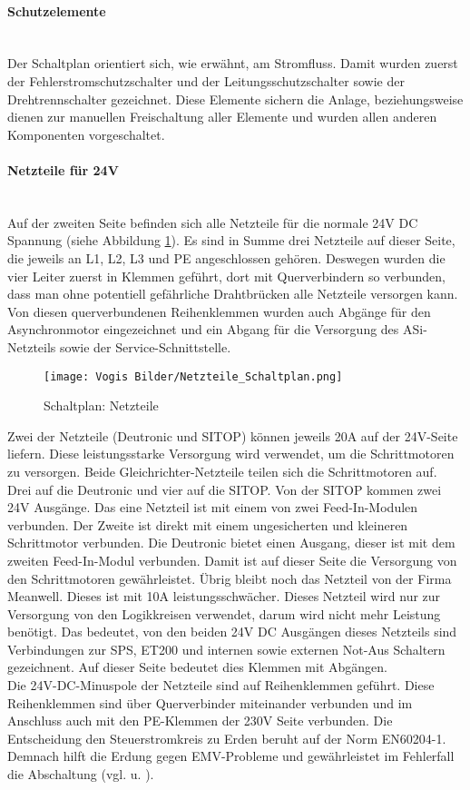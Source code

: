     \paragraph{Schutzelemente }\mbox{}\\
    Der Schaltplan orientiert sich, wie erwähnt, am Stromfluss. Damit wurden zuerst der Fehlerstromschutzschalter und der Leitungsschutzschalter sowie der Drehtrennschalter gezeichnet. Diese Elemente sichern die Anlage, beziehungsweise dienen zur manuellen Freischaltung aller Elemente und wurden allen anderen Komponenten vorgeschaltet.
    \paragraph{Netzteile für 24V }\mbox{}\\
    Auf der zweiten Seite befinden sich alle Netzteile für die normale 24V DC Spannung (siehe Abbildung \ref{fig:Netzteile}). Es sind in Summe drei Netzteile auf dieser Seite, die jeweils an L1, L2, L3 und PE angeschlossen gehören. Deswegen wurden die vier Leiter zuerst in Klemmen geführt, dort mit Querverbindern so verbunden, dass man ohne potentiell gefährliche Drahtbrücken alle Netzteile versorgen kann. Von diesen querverbundenen Reihenklemmen wurden auch Abgänge für den Asynchronmotor eingezeichnet und ein Abgang für die Versorgung des ASi-Netzteils sowie der Service-Schnittstelle.\\ 
    \begin{figure}[h]
        \centering
        \texttt{[image: Vogis Bilder/Netzteile\_Schaltplan.png]}
        \caption{Schaltplan: Netzteile}
        \label{fig:Netzteile}
    \end{figure}
    Zwei der Netzteile (Deutronic und SITOP) können jeweils 20A auf der 24V-Seite liefern. Diese leistungsstarke Versorgung wird verwendet, um die Schrittmotoren zu versorgen. Beide Gleichrichter-Netzteile teilen sich die Schrittmotoren auf. Drei auf die Deutronic und vier auf die SITOP. Von der SITOP kommen zwei 24V Ausgänge. Das eine Netzteil ist mit einem von zwei Feed-In-Modulen verbunden. Der Zweite ist direkt mit einem ungesicherten und kleineren Schrittmotor verbunden. Die Deutronic bietet einen Ausgang, dieser ist mit dem zweiten Feed-In-Modul verbunden. Damit ist auf dieser Seite die Versorgung von den Schrittmotoren gewährleistet. Übrig bleibt noch das Netzteil von der Firma Meanwell. Dieses ist mit 10A leistungsschwächer. Dieses Netzteil wird nur zur Versorgung von den Logikkreisen verwendet, darum wird nicht mehr Leistung benötigt. Das bedeutet, von den beiden 24V DC Ausgängen dieses Netzteils sind Verbindungen zur SPS, ET200 und internen sowie externen Not-Aus Schaltern gezeichnent. Auf dieser Seite bedeutet dies Klemmen mit Abgängen.\\    
    Die 24V-DC-Minuspole der Netzteile sind auf Reihenklemmen geführt. Diese Reihenklemmen sind über Querverbinder miteinander verbunden und im Anschluss auch mit den PE-Klemmen der 230V Seite verbunden. Die Entscheidung den Steuerstromkreis zu Erden beruht auf der Norm EN60204-1. Demnach hilft die Erdung gegen EMV-Probleme und gewährleistet im Fehlerfall die Abschaltung (vgl. \cite{elektronet_steuerstromkreis_geerdet} u. \cite{beckhoff_steuerstromkreis_geerdet}).
